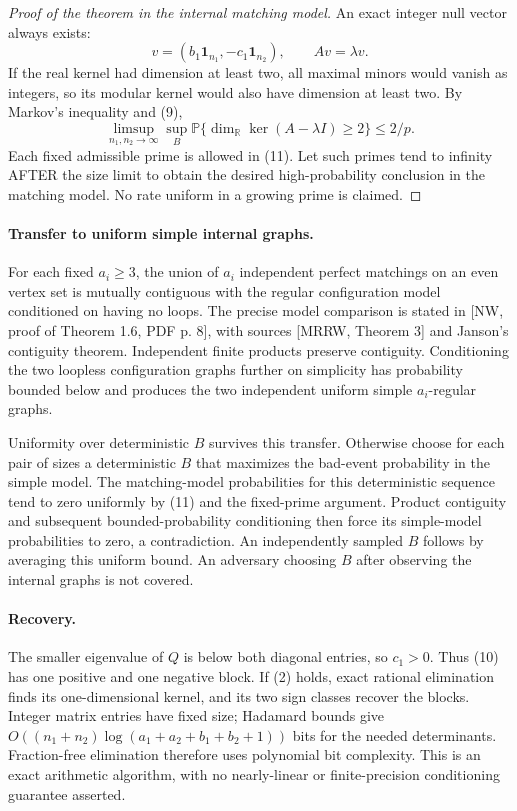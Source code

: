 \documentclass[11pt]{article}
\newcommand{\Prb}{\mathbb P}
\newcommand{\one}{\mathbf1}
\begin{document}
\begin{proof}[Proof of the theorem in the internal matching model]
An exact integer null vector always exists:
\[
 v=(b_1\one_{n_1},-c_1\one_{n_2}),\qquad Av=\lambda v.
 \tag{10}
\]
If the real kernel had dimension at least two, all maximal minors would
vanish as integers, so its modular kernel would also have dimension at
least two. By Markov's inequality and (9),
\[
 \limsup_{n_1,n_2\to\infty}
 \sup_B\Prb\{\dim_{\mathbb R}\ker(A-\lambda I)\geq2\}
 \leq2/p.                                               \tag{11}
\]
Each fixed admissible prime is allowed in (11). Let such primes tend to
infinity AFTER the size limit to obtain the desired high-probability
conclusion in the matching model. No rate uniform in a growing prime
is claimed.
\end{proof}

\paragraph{Transfer to uniform simple internal graphs.}
For each fixed $a_i\geq3$, the union of $a_i$ independent perfect
matchings on an even vertex set is mutually contiguous with the regular
configuration model conditioned on having no loops. The precise model
comparison is stated in [NW, proof of Theorem 1.6, PDF p. 8], with sources
[MRRW, Theorem 3] and Janson's contiguity theorem. Independent finite
products preserve contiguity. Conditioning the two loopless configuration
graphs further on simplicity has probability bounded below and produces
the two independent uniform simple $a_i$-regular graphs.

Uniformity over deterministic $B$ survives this transfer. Otherwise choose
for each pair of sizes a deterministic $B$ that maximizes the bad-event
probability in the simple model. The matching-model probabilities for
this deterministic sequence tend to zero uniformly by (11) and the
fixed-prime argument. Product contiguity and subsequent bounded-probability
conditioning then force its simple-model probabilities to zero, a
contradiction. An independently sampled $B$ follows by averaging this
uniform bound. An adversary choosing $B$ after observing the internal
graphs is not covered.

\paragraph{Recovery.}
The smaller eigenvalue of $Q$ is below both diagonal entries, so
$c_1>0$. Thus (10) has one positive and one negative block. If (2) holds,
exact rational elimination finds its one-dimensional kernel, and its two
sign classes recover the blocks. Integer matrix entries have fixed size;
Hadamard bounds give $O((n_1+n_2)\log(a_1+a_2+b_1+b_2+1))$ bits for
the needed determinants. Fraction-free elimination therefore uses
polynomial bit complexity. This is an exact arithmetic algorithm, with
no nearly-linear or finite-precision conditioning guarantee asserted.
\end{document}
